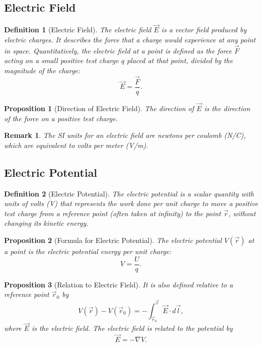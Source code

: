 \documentclass{article}
\newtheorem{definition}{Definition}
\newtheorem{remark}{Remark}
\newtheorem{proposition}{Proposition}
\begin{document}
\subsection{Electric Field}
\begin{definition}[Electric Field]
    The electric field $\vec{E}$ is a vector field produced by electric charges. It describes the force that a charge would experience at any point in space. Quantitatively, the electric field at a point is defined as the force $\vec{F}$ acting on a small positive test charge $q$ placed at that point, divided by the magnitude of the charge:
    \[\vec{E} = \frac{\vec{F}}{q}.\]
\end{definition}
\begin{proposition}[Direction of Electric Field]
    The direction of $\vec{E}$ is the direction of the force on a positive test charge.
\end{proposition}
\begin{remark}
    The SI units for an electric field are newtons per coulomb (N/C), which are equivalent to volts per meter (V/m).
\end{remark}

\subsection{Electric Potential}
\begin{definition}[Electric Potential]
    The electric potential is a scalar quantity with units of volts (V) that represents the work done per unit charge to move a positive test charge from a reference point (often taken at infinity) to the point $\vec{r}$, without changing its kinetic energy.   
\end{definition}
\begin{proposition}[Formula for Electric Potential]
    The electric potential $V(\vec{r})$ at a point is the electric potential energy per unit charge:
    \[V = \frac{U}{q}.\]
\end{proposition}
\begin{proposition}[Relation to Electric Field]
    It is also defined relative to a reference point $\vec{r}_0$ by
    \[V(\vec{r}) - V(\vec{r}_0) = -\int_{\vec{r}_0}^{\vec{r}} \vec{E} \cdot d\vec{l},\]
    where $\vec{E}$ is the electric field. The electric field is related to the potential by
    \[\vec{E} = -\nabla V.\]
\end{proposition}
\end{document}
